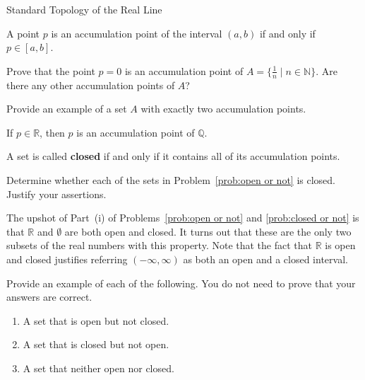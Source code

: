 \begin{section}{Standard Topology of the Real Line}
\begin{theorem}
A point $p$ is an accumulation point of the interval $(a,b)$ if and only if $p\in [a,b]$.
\end{theorem}

\begin{problem}
Prove that the point $p=0$ is an accumulation point of $A=\{\frac{1}{n}\mid n \in \mathbb{N}\}$.  Are there any other accumulation points of $A$? 
\end{problem}

\begin{problem}
Provide an example of a set $A$ with exactly two accumulation points.
\end{problem}

\begin{theorem}
If $p\in\mathbb{R}$, then $p$ is an accumulation point of $\mathbb{Q}$.
\end{theorem}

\begin{definition}
A set is called \textbf{closed} if and only if it contains all of its accumulation points.
\end{definition}

\begin{problem}\label{prob:closed or not}
Determine whether each of the sets in Problem~\ref{prob:open or not} is closed. Justify your assertions.
\end{problem}

The upshot of Part~(i) of Problems~\ref{prob:open or not} and \ref{prob:closed or not} is that $\mathbb{R}$ and $\emptyset$ are both open and closed.  It turns out that these are the only two subsets of the real numbers with this property.  Note that the fact that $\mathbb{R}$ is open and closed justifies referring $(-\infty, \infty)$ as both an open and a closed interval.

\begin{problem}\label{prob:open vs closed}
Provide an example of each of the following.  You do not need to prove that your answers are correct.
\begin{enumerate}[label=\textrm{(\alph*)}]
\item A set that is open but not closed.
\item A set that is closed but not open.
\item\label{prob:open vs closed last} A set that neither open nor closed.
\end{enumerate}
\end{problem}


\end{section}
